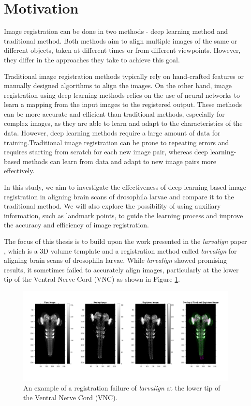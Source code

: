 \documentclass{report}
\begin{document}
	\section{Motivation}
	Image registration can be done in two methods - deep learning method and traditional method. Both methods aim to align multiple images of the same or different objects, taken at different times or from different viewpoints. However, they differ in the approaches they take to achieve this goal.
	
	Traditional image registration methods typically rely on hand-crafted features or manually designed algorithms to align the images. On the other hand, image registration using deep learning methods relies on the use of neural networks to learn a mapping from the input images to the registered output. These methods can be more accurate and efficient than traditional methods, especially for complex images, as they are able to learn and adapt to the characteristics of the data. However, deep learning methods require a large amount of data for training.Traditional image registration can be prone to repeating errors and requires starting from scratch for each new image pair, whereas deep learning-based methods can learn from data and adapt to new image pairs more effectively.
	
	In this study, we aim to investigate the effectiveness of deep learning-based image registration in aligning brain scans of drosophila larvae and compare it to the traditional method. We will also explore the possibility of using auxiliary information, such as landmark points, to guide the learning process and improve the accuracy and efficiency of image registration.
	
	The focus of this thesis is to build upon the work presented in the \textit{larvalign} paper \cite{larvalign}, which is a 3D volume template and a registration method called \textit{larvalign} for aligning brain scans of drosophila larvae. While \textit{larvalign} showed promising results, it sometimes failed to accurately align images, particularly at the lower tip of the Ventral Nerve Cord (VNC) as shown in Figure \ref{fig:Registraion_Failure}.
	
	\begin{figure}[H]
		\centering
		\includegraphics[width=\linewidth]{resources/motivation_fig_1.jpg}
		\caption{An example of a registration failure of \textit{larvalign} \cite{larvalign} at the lower tip of the Ventral Nerve Cord (VNC).}
		\label{fig:Registraion_Failure}
	\end{figure}
	
\end{document}
